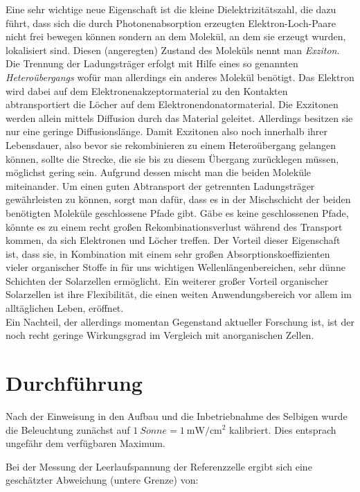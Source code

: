 \documentclass[slug=SZ, room=Hermann-Krone-Bau\,\ Labor\ 1.25,
supervisor=Martin\ Kroll, coursedate=14.\ 11.\ 2019]{../../Lab_Report_LaTeX/lab_report}
\newcommand{\sun}[1]{\SI{#1}{Sonne}}
\newcommand{\mwcm}[1]{\SI{#1}{\milli\watt\per\centi\meter^2}}
\begin{document}
Eine sehr wichtige neue Eigenschaft ist die kleine Dielektrizitätszahl, die dazu führt, dass sich die durch
Photonenabsorption erzeugten Elektron-Loch-Paare nicht frei bewegen können sondern an dem Molekül, an dem sie
erzeugt wurden, lokalisiert sind. Diesen (angeregten) Zustand des Moleküls nennt man \emph{Exziton}.
Die Trennung der Ladungsträger erfolgt mit Hilfe eines so genannten \emph{Heteroübergangs} wofür man allerdings
ein anderes Molekül benötigt. Das Elektron wird dabei auf dem Elektronenakzeptormaterial zu den Kontakten
abtransportiert die Löcher auf dem Elektronendonatormaterial.
Die Exzitonen werden allein mittels Diffusion durch das Material geleitet. Allerdings besitzen sie nur eine
geringe Diffusionslänge. Damit Exzitonen also noch innerhalb ihrer Lebensdauer, also bevor sie rekombinieren
zu einem Heteroübergang gelangen können, sollte die Strecke, die sie bis zu diesem Übergang zurücklegen müssen,
möglichst gering sein. Aufgrund dessen mischt man die beiden Moleküle miteinander.
Um einen guten Abtransport der getrennten Ladungsträger gewährleisten zu können, sorgt man dafür, dass es in der
Mischschicht der beiden benötigten Moleküle geschlossene Pfade gibt. Gäbe es keine geschlossenen Pfade, könnte
es zu einem recht großen Rekombinationsverlust während des Transport kommen, da sich Elektronen und Löcher
treffen.
Der Vorteil dieser Eigenschaft ist, dass sie, in Kombination mit einem sehr großen Absorptionskoeffizienten
vieler organischer Stoffe in für uns wichtigen Wellenlängenbereichen, sehr dünne Schichten der Solarzellen
ermöglicht.
Ein weiterer großer Vorteil organischer Solarzellen ist ihre Flexibilität, die einen weiten Anwendungsbereich
vor allem im alltäglichen Leben, eröffnet.\\

Ein Nachteil, der allerdings momentan Gegenstand aktueller Forschung ist, ist der noch recht geringe
Wirkungsgrad im Vergleich mit anorganischen Zellen.


\section{Durchf\"uhrung}
\label{sec:durchf}

Nach der Einweisung in den Aufbau und die Inbetriebnahme des Selbigen
wurde die Beleuchtung zun\"achst auf $\sun{1}=\mwcm{1}$
kalibriert. Dies entsprach ungef\"ahr dem verf\"ugbaren Maximum.

Bei der Messung der Leerlaufspannung der Referenzzelle ergibt sich eine
gesch\"atzter Abweichung (untere Grenze) von:
\end{document}
